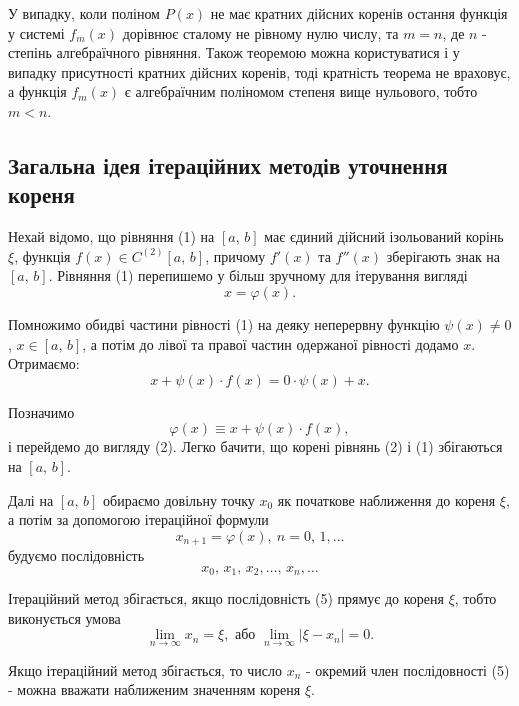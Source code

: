 \documentclass[14pt,a4paper,titlepage]{extarticle}
\begin{document}
У випадку, коли поліном $P(x)$ не має кратних дійсних коренів остання функція у системі
$f_m(x)$ дорівнює сталому не рівному нулю числу, та $m=n$, де $n$ - степінь алгебраїчного рівняння. Також теоремою можна користуватися і у випадку присутності кратних дійсних коренів, тоді кратність теорема не враховує, а функція $f_m(x)$ є алгебраїчним поліномом степеня вище нульового, тобто $m<n$.

{\centering \subsection{Загальна ідея ітераційних методів уточнення кореня}}  
Нехай відомо, що рівняння (1) на $[a,\, b]$ має єдиний дійсний ізольований корінь 
$\xi$, функція $f(x)\in C^{(2)}[a,\, b]$, причому $f'(x)$ та $f''(x)$ зберігають знак на $[a,\, b]$. Рівняння (1) перепишемо у більш зручному для ітерування вигляді
\begin{equation}
x=\varphi(x).
\end{equation}

Помножимо обидві частини рівності (1) на деяку неперервну функцію $\psi(x)\neq0$, $x\in [a,\, b]$, а потім до лівої та правої частин одержаної рівності додамо $x$. Отримаємо:
$$x+\psi(x)\cdot f(x)=0\cdot\psi(x)+x.$$

Позначимо 
\begin{equation}
\varphi(x)\equiv x+\psi(x)\cdot f(x),
\end{equation}
і перейдемо до вигляду (2). Легко бачити, що корені рівнянь (2) і (1) збігаються на $[a,\, b]$. 

Далі на $[a,\, b]$ обираємо довільну точку $x_0$ як початкове наближення до кореня $\xi$, а потім за допомогою ітераційної формули
\begin{equation}
x_{n+1}=\varphi(x),\ n=0,\,1,\ldots
\end{equation}
будуємо послідовність 
\begin{equation}
x_0,\,x_1,\,x_2,\ldots,\,x_n,\ldots
\end{equation}

Ітераційний метод збігається, якщо послідовність (5) прямує до кореня $\xi$, тобто виконується умова
\begin{equation}
\lim_{n\to\infty}x_n=\xi,\text{ або }\lim_{n\to\infty}\left|\xi-x_n\right|=0.
\end{equation}

Якщо ітераційний метод збігається, то число $x_n$ - окремий член послідовності (5) - можна вважати наближеним значенням кореня $\xi$.
\end{document}
